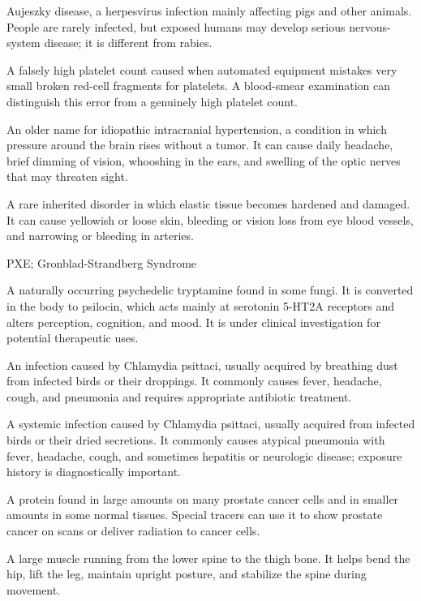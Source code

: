  Aujeszky disease, a herpesvirus infection mainly affecting pigs and other animals. People are rarely infected, but exposed humans may develop serious nervous-system disease; it is different from rabies.

 A falsely high platelet count caused when automated equipment mistakes very small broken red-cell fragments for platelets. A blood-smear examination can distinguish this error from a genuinely high platelet count.

 An older name for idiopathic intracranial hypertension, a condition in which pressure around the brain rises without a tumor. It can cause daily headache, brief dimming of vision, whooshing in the ears, and swelling of the optic nerves that may threaten sight.

 A rare inherited disorder in which elastic tissue becomes hardened and damaged. It can cause yellowish or loose skin, bleeding or vision loss from eye blood vessels, and narrowing or bleeding in arteries.

\synonyms
PXE; Gronblad-Strandberg Syndrome

 A naturally occurring psychedelic tryptamine found in some fungi. It is converted in the body to psilocin, which acts mainly at serotonin 5-HT2A receptors and alters perception, cognition, and mood. It is under clinical investigation for potential therapeutic uses.

 An infection caused by Chlamydia psittaci, usually acquired by breathing dust from infected birds or their droppings. It commonly causes fever, headache, cough, and pneumonia and requires appropriate antibiotic treatment.

 A systemic infection caused by Chlamydia psittaci, usually acquired from infected birds or their dried secretions. It commonly causes atypical pneumonia with fever, headache, cough, and sometimes hepatitis or neurologic disease; exposure history is diagnostically important.

 A protein found in large amounts on many prostate cancer cells and in smaller amounts in some normal tissues. Special tracers can use it to show prostate cancer on scans or deliver radiation to cancer cells.

 A large muscle running from the lower spine to the thigh bone. It helps bend the hip, lift the leg, maintain upright posture, and stabilize the spine during movement.

